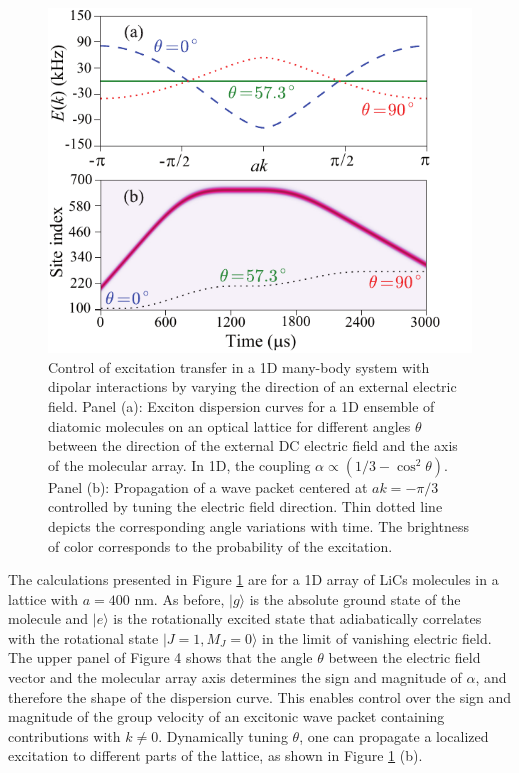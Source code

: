 \begin{figure}[htbp]
\centering
\includegraphics[width=\linewidth]{control-exciton.pdf}
\caption{ Control of excitation transfer in a 1D many-body system with dipolar interactions by varying the 
direction of an external electric field.
Panel (a): Exciton dispersion curves for a 1D
ensemble  of diatomic molecules on an optical lattice for
different angles $\theta$ between the direction of the external DC
electric field and the axis of the molecular array.  In 1D, the coupling $\alpha\propto (1/3 - \cos^2\theta)$.  Panel (b):
Propagation of a wave packet centered at $ak =-\pi/3$ controlled
by tuning the electric field direction. Thin dotted line depicts
the corresponding angle variations with time. The brightness
of color corresponds to the probability of the excitation. }
\label{control-exciton}
\end{figure}



The calculations presented in Figure \ref{control-exciton} are for a 1D array of LiCs molecules in a lattice with  $a=400$ nm.
As before, $|g\rangle$ is the absolute ground state of the molecule and $|e\rangle$ is the rotationally excited state
 that adiabatically correlates
with the rotational state $|J=1, M_J = 0 \rangle$ in the limit of vanishing electric field. 
The upper panel of Figure 4
shows that the angle $\theta$ between the electric field vector and the molecular array axis
determines the sign and magnitude of $\alpha$, and therefore the shape of the dispersion
curve. This enables
control over the sign and magnitude of the group velocity of an
excitonic wave packet containing contributions with $k\neq 0$. Dynamically tuning $\theta$,
one can propagate a localized excitation to different parts of the
lattice, as shown in Figure \ref{control-exciton} (b).

